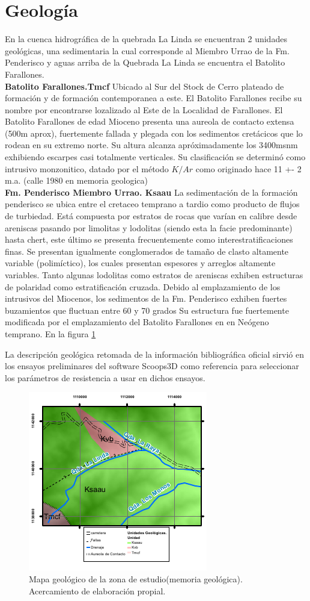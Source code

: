 \section{Geolog\'ia}
En la cuenca hidrogr\'afica de la quebrada La Linda se encuentran 2 unidades geol\'ogicas, una sedimentaria la cual corresponde al Miembro Urrao de la Fm. Penderisco y aguas arriba de la Quebrada La Linda se encuentra el Batolito Farallones.\\

\textbf{Batolito Farallones.Tmcf}
Ubicado al Sur del Stock de Cerro plateado de formaci\'on y de formaci\'on contemporanea a este. El Batolito Farallones recibe su nombre por encontrarse lozalizado al Este de la Localidad de Farallones.
El Batolito Farallones de edad Mioceno presenta una aureola de contacto extensa (500m aprox), fuertemente fallada y plegada con los sedimentos cret\'acicos que lo rodean en su extremo norte. Su altura alcanza apr\'oximadamente los 3400msnm exhibiendo escarpes casi totalmente verticales.
Su clasificaci\'on se determin\'o como intrusivo monzonitico, datado por el m\'etodo $K/Ar$ como originado hace 11 +- 2 m.a. (calle 1980 en memoria geologica)\\
 

\textbf{Fm. Penderisco Miembro Urrao. Ksaau}
La sedimentaci\'on de la formaci\'on penderisco se ubica entre el cretaceo temprano a tardio como producto de flujos de turbiedad.
Est\'a compuesta por estratos de rocas que var\'ian en calibre desde areniscas pasando por limolitas y lodolitas (siendo esta la facie predominante) hasta chert, este \'ultimo se presenta frecuentemente como interestratificaciones finas. Se presentan igualmente conglomerados de tama\~no de clasto altamente variable (polim\'ictico), los cuales presentan espesores y arreglos altamente variables.
Tanto algunas lodolitas como estratos de areniscas exhiben estructuras de polaridad como estratificaci\'on cruzada.
Debido al emplazamiento de los intrusivos del Miocenos, los sedimentos de la Fm. Penderisco exhiben fuertes buzamientos que fluctuan  entre 60 y 70 grados 
Su estructura fue fuertemente modificada por el emplazamiento del Batolito Farallones en en Ne\'ogeno temprano. En la figura \ref{fig:mapageo}

La descripci\'on geol\'ogica retomada de la informaci\'on bibliogr\'afica oficial sirvi\'o en los ensayos preliminares del software Scoops3D como referencia para seleccionar los par\'ametros de resistencia a usar en dichos ensayos.

\begin{figure}[H]
\centering
\includegraphics[scale=3]{img/geologia.pdf}
\caption{Mapa geol\'ogico de la zona de estudio(memoria geol\'ogica). Acercamiento de elaboraci\'on propial.}
\label{fig:mapageo}
\end{figure}


